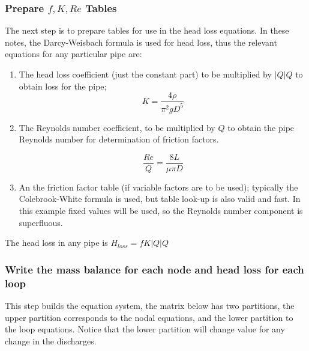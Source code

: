 \subsubsection{Prepare $f,K,Re$ Tables}
The next step is to prepare tables for use in the head loss equations.  In these notes, the Darcy-Weisbach formula is used for head loss, thus the relevant equations for any particular pipe are:
\begin{enumerate}
\item The head loss coefficient (just the constant part) to be multiplied by $|Q|Q$ to obtain loss for the pipe;
\begin{equation}
K=\frac{4 \rho}{\pi^2 g D^5}
\end{equation}

\item The Reynolds number coefficient, to be multiplied by $Q$ to obtain the pipe Reynolds number for determination of friction factors.


\begin{equation}
\frac{Re}{Q}=\frac{8L}{\mu \pi D}
\end{equation}
\item An the friction factor table (if variable factors are to be used); typically the Colebrook-White formula is used, but table look-up is also valid and fast.  In this example fixed values will be used, so the Reynolds number component is superfluous.

\end{enumerate}

The head loss in any pipe is $H_{loss} = f K |Q| Q$

\subsubsection{Write the mass balance for each node and head loss for each loop}
This step builds the equation system, the matrix below has two partitions, the upper partition corresponds to the nodal equations, and the lower partition to the loop equations.  Notice that the lower partition will change value for any change in the discharges.

